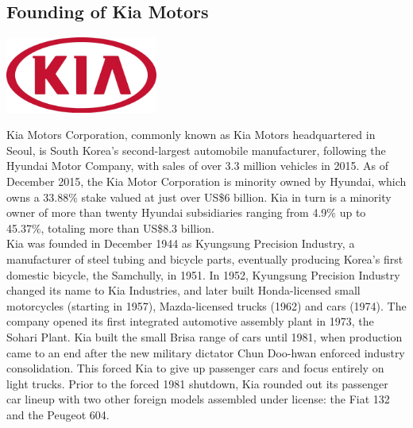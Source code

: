 \documentclass[11pt]{report}
\begin{document}
\subsection{Founding of Kia Motors}
\vspace{2mm}\begin{center}\includegraphics[width=5cm]{./img/kiaLogo.jpg}\end{center}
Kia Motors Corporation, commonly known as Kia Motors headquartered in Seoul, is South Korea's second-largest automobile manufacturer, following the Hyundai Motor Company, with sales of over 3.3 million vehicles in 2015. As of December 2015, the Kia Motor Corporation is minority owned by Hyundai, which owns a 33.88\% stake valued at just over US\$6 billion. Kia in turn is a minority owner of more than twenty Hyundai subsidiaries ranging from 4.9\% up to 45.37\%, totaling more than US\$8.3 billion.\\
\indent Kia was founded in December 1944 as Kyungsung Precision Industry, a manufacturer of steel tubing and bicycle parts, eventually producing Korea's first domestic bicycle, the Samchully, in 1951. In 1952, Kyungsung Precision Industry changed its name to Kia Industries, and later built Honda-licensed small motorcycles (starting in 1957), Mazda-licensed trucks (1962) and cars (1974). The company opened its first integrated automotive assembly plant in 1973, the Sohari Plant. Kia built the small Brisa range of cars until 1981, when production came to an end after the new military dictator Chun Doo-hwan enforced industry consolidation. This forced Kia to give up passenger cars and focus entirely on light trucks. Prior to the forced 1981 shutdown, Kia rounded out its passenger car lineup with two other foreign models assembled under license: the Fiat 132 and the Peugeot 604. 

\end{document}
